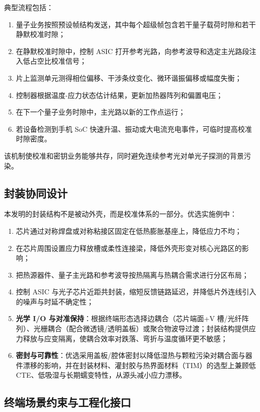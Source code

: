 \documentclass[12pt,a4paper]{article}
\begin{document}
典型流程包括：
\begin{enumerate}[label=\textbf{S\arabic*.}]
    \item 量子业务按照预设帧结构发送，其中每个超级帧包含若干量子载荷时隙和若干静默校准时隙；
    \item 在静默校准时隙中，控制 ASIC 打开参考光路，向参考波导和选定主光路段注入低占空比校准信号；
    \item 片上监测单元测得相位偏移、干涉条纹变化、微环谐振偏移或幅度失衡；
    \item 控制器根据温度-应力状态估计结果，更新加热器阵列和偏置电压；
    \item 在下一个量子业务时隙中，主光路以新的工作点运行；
    \item 若设备检测到手机 SoC 快速升温、振动或大电流充电事件，可临时提高校准时隙密度。
\end{enumerate}

该机制使校准和密钥业务能够共存，同时避免连续参考光对单光子探测的背景污染。

\subsection{封装协同设计}

本发明的封装结构不是被动外壳，而是校准体系的一部分。优选实施例中：
\begin{enumerate}[label=(\arabic*)]
    \item 芯片通过对称焊盘或对称粘接区固定在低热膨胀基座上，降低应力不均；
    \item 在芯片周围设置应力释放槽或柔性连接梁，降低外壳形变对核心光路区的影响；
    \item 把热源器件、量子主光路和参考波导按热隔离与热耦合需求进行分区布局；
    \item 控制 ASIC 与光子芯片近距共封装，缩短反馈链路延迟，并降低片外连线引入的噪声与时延不确定性；
    \item \textbf{光学 I/O 与对准保持}：根据终端形态选择边耦合（芯片端面+V 槽/光纤阵列）、光栅耦合（配合微透镜/透明盖板）或聚合物波导过渡；封装结构提供应力释放与应变隔离，使耦合效率对跌落、弯折与温度循环更不敏感；
    \item \textbf{密封与可靠性}：优选采用盖板/腔体密封以降低湿热与颗粒污染对耦合面与器件漂移的影响，并在封装材料、灌封胶与热界面材料（TIM）的选型上兼顾低 CTE、低吸湿与长期蠕变特性，从源头减小应力漂移。
\end{enumerate}

\subsection{终端场景约束与工程化接口}
\end{document}
